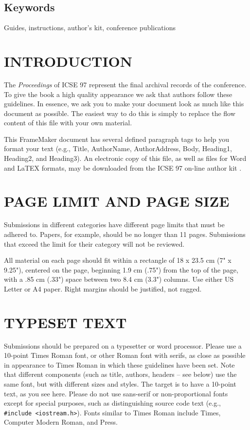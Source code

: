 \subsection{Keywords}
Guides, instructions, author's kit, conference publications

\section{INTRODUCTION}
The {\it Proceedings} of ICSE 97 represent the final archival 
records of the conference. To give the book a high quality 
appearance we ask that authors follow these guidelines. In 
essence, we ask you to make your document look as much 
like this document as possible. The easiest way to do this is 
simply to replace the flow content of this file with your own 
material.
 
This FrameMaker document has several defined paragraph 
tags to help you format your text (e.g., Title, AuthorName, 
AuthorAddress, Body, Heading1, Heading2, and Heading3). 
An electronic copy of this file, as well as files for Word and 
LaTEX formats, may be downloaded from the ICSE 97 on-line author kit \cite{EAK}.

\section{PAGE LIMIT AND PAGE SIZE}
Submissions in different categories have different page 
limits that must be adhered to. Papers, for example, should 
be no longer than 11 pages. Submissions that exceed the 
limit for their category will not be reviewed.
 
All material on each page should fit within a rectangle of 
18 x 23.5 cm (7" x 9.25"), centered on the page, beginning 
1.9 cm (.75") from the top of the page, with a .85 cm (.33") 
space between two 8.4 cm (3.3") columns. Use either US 
Letter or A4 paper. Right margins should be justified, not 
ragged.

\section{TYPESET TEXT}
Submissions should be prepared on a typesetter or word 
processor. Please use a 10-point Times Roman font, or other 
Roman font with serifs, as close as possible in appearance to 
Times Roman in which these guidelines have been set. Note 
that different components (such as title, authors, headers -- 
see below) use the same font, but with different sizes and 
styles. The target is to have a 10-point text, as you see here. 
Please do not use sans-serif or non-proportional fonts except 
for special purposes, such as distinguishing source code text 
(e.g., \verb|#include <iostream.h>|). Fonts similar to Times 
Roman include Times, Computer Modern Roman, and Press.
 
